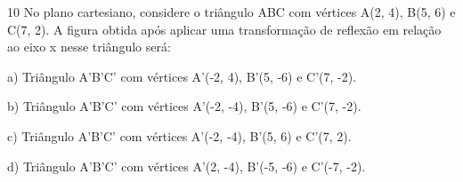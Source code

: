 

\num{10} No plano cartesiano, considere o triângulo ABC com vértices A(2, 4),
B(5, 6) e C(7, 2). A figura obtida após aplicar uma transformação de
reflexão em relação ao eixo x nesse triângulo será:

a) Triângulo A'B'C' com vértices A'(-2, 4), B'(5, -6) e C'(7, -2).

b) Triângulo A'B'C' com vértices A'(-2, -4), B'(5, -6) e C'(7, -2).

c) Triângulo A'B'C' com vértices A'(-2, -4), B'(5, 6) e C'(7, 2).

d) Triângulo A'B'C' com vértices A'(2, -4), B'(-5, -6) e C'(-7, -2).




